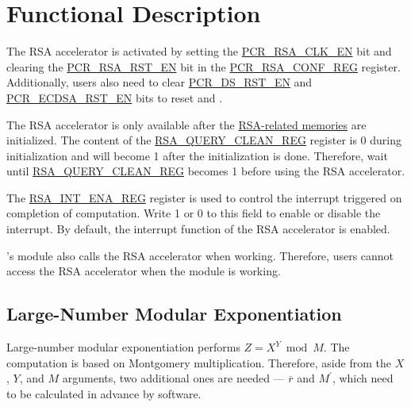 \documentclass[main\_\_EN.tex]{subfiles}
\begin{document}
\section{Functional Description}\label{sec:rsa-func-desc}

The RSA accelerator is activated by setting the \hyperref[fielddesc:PCRRSACLKEN]{PCR\_RSA\_CLK\_EN} bit and clearing the \hyperref[fielddesc:PCRRSARSTEN]{PCR\_RSA\_RST\_EN} bit in the \hyperref[regdesc:PCRRSACONFREG]{PCR\_RSA\_CONF\_REG} register. Additionally, users also need to clear \hyperref[fielddesc:PCRDSRSTEN]{PCR\_DS\_RST\_EN} and \hyperref[fielddesc:PCRECDSARSTEN]{PCR\_ECDSA\_RST\_EN} bits to reset  and .

The RSA accelerator is only available after the \hyperref[sec:mem-sum]{RSA-related memories} are initialized. The content of the \hyperref[regdesc:RSAQUERYCLEANREG]{RSA\_QUERY\_CLEAN\_REG} register is 0 during initialization and will become 1 after the initialization is done. Therefore, wait until \hyperref[regdesc:RSAQUERYCLEANREG]{RSA\_QUERY\_CLEAN\_REG} becomes 1 before using the RSA accelerator.

The \hyperref[regdesc:RSAINTENAREG]{RSA\_INT\_ENA\_REG} register is used to control the interrupt triggered on completion of computation. Write 1 or 0 to this field to enable or disable the interrupt. By default, the interrupt function of the RSA accelerator is enabled.


\begin{importantlisting}
\vspace{-0.5em}

    \chipname{}'s  module also calls the RSA accelerator when working. Therefore, users cannot access the RSA accelerator when the  module is working.
\end{importantlisting}

\subsection{Large-Number Modular Exponentiation} \label{sec:rsa-large-modular-Exponentiation}

Large-number modular exponentiation performs \begin{math}Z = X^{Y} \bmod M\end{math}. The computation is based on Montgomery multiplication. Therefore, aside from the \begin{math}X\end{math},
\begin{math}Y\end{math}, and
\begin{math}M\end{math} arguments, two additional ones are needed --- \begin{math}\overline{r}\end{math} and
\begin{math}M^{\prime}\end{math}, which need to be calculated in advance by software.
\end{document}
